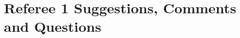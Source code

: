 \documentclass[11pt,english]{article}
\begin{document}


\newpage \setcounter{Ref}{1}\setcounter{RefComment}{0}
\section*{Referee 1 Suggestions, Comments and Questions}

\addtocounter{TotalComments}{\value{RefComment}} 
 
\end{document}
